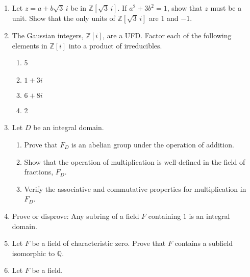 {\small
\begin{enumerate}

\item
Let $z = a + b \sqrt{3}\, i$ be in ${\mathbb Z}[ \sqrt{3}\, i]$. If $a^2 +3 b^2 = 1$, show that $z$ must be a unit. Show that the only units of ${\mathbb Z}[ \sqrt{3}\, i ]$ are 1 and $-1$. 

\item
The Gaussian integers, ${\mathbb Z}[i]$, are a UFD.  Factor each of the following elements in ${\mathbb Z}[i]$ into a product of irreducibles.
\begin{multicols}{2}
\begin{enumerate}

\item 
5

\item 
$1 + 3i$

\item 
$6+8i$

\item 
2

\end{enumerate}
\end{multicols}

 
\item
Let $D$ be an integral domain. 
\begin{enumerate}
 
 \item
Prove that $F_D$ is an abelian group under the operation of addition.

 \item
Show that the operation of multiplication is well-defined in the field
of fractions, $F_D$.  
 
 \item
Verify the associative and commutative properties for multiplication
in $F_D$. 

\end{enumerate}


\item
Prove or disprove: Any subring of a field $F$ containing $1$ is an
integral domain.

 
\item
Let $F$ be a field of characteristic zero. Prove that $F$ contains a
subfield isomorphic to ${\mathbb Q}$.
 
\item
Let $F$ be a field.
\begin{enumerate}


\end{enumerate}
\end{enumerate}}
